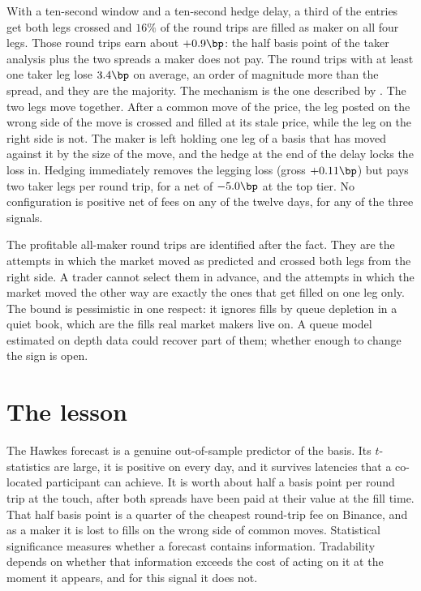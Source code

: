 \documentclass[a4paper,11pt]{article}
\begin{document}
With a ten-second window and a ten-second hedge delay, a third of the entries get both legs crossed and $16\%$ of the round trips are filled as maker on all four legs. Those round trips earn about $+0.9\bp$: the half basis point of the taker analysis plus the two spreads a maker does not pay. The round trips with at least one taker leg lose $3.4\bp$ on average, an order of magnitude more than the spread, and they are the majority. The mechanism is the one described by \cite{albers2025}. The two legs move together. After a common move of the price, the leg posted on the wrong side of the move is crossed and filled at its stale price, while the leg on the right side is not. The maker is left holding one leg of a basis that has moved against it by the size of the move, and the hedge at the end of the delay locks the loss in. Hedging immediately removes the legging loss (gross $+0.11\bp$) but pays two taker legs per round trip, for a net of $-5.0\bp$ at the top tier. No configuration is positive net of fees on any of the twelve days, for any of the three signals.

The profitable all-maker round trips are identified after the fact. They are the attempts in which the market moved as predicted and crossed both legs from the right side. A trader cannot select them in advance, and the attempts in which the market moved the other way are exactly the ones that get filled on one leg only. The bound is pessimistic in one respect: it ignores fills by queue depletion in a quiet book, which are the fills real market makers live on. A queue model estimated on depth data could recover part of them; whether enough to change the sign is open.

\section{The lesson}

The Hawkes forecast is a genuine out-of-sample predictor of the basis. Its $t$-statistics are large, it is positive on every day, and it survives latencies that a co-located participant can achieve. It is worth about half a basis point per round trip at the touch, after both spreads have been paid at their value at the fill time. That half basis point is a quarter of the cheapest round-trip fee on Binance, and as a maker it is lost to fills on the wrong side of common moves. Statistical significance measures whether a forecast contains information. Tradability depends on whether that information exceeds the cost of acting on it at the moment it appears, and for this signal it does not.
\end{document}
